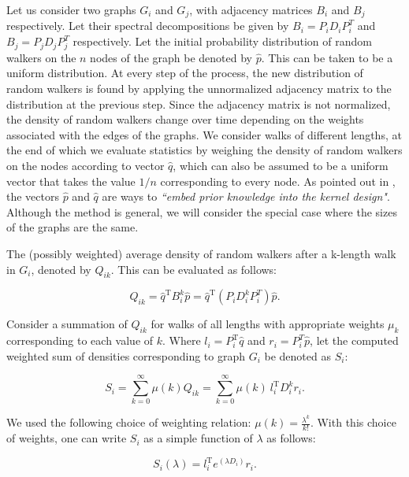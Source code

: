 Let us consider two graphs $G_i$ and $G_j$, with adjacency matrices
$B_i$ and $B_j$ respectively.
% 
Let their spectral decompositions be given by $B_i = P_i D_i P_i^{T}$
and $B_j = P_j D_j P_j^{T}$ respectively.
% 
% 
Let the initial probability distribution of random walkers on the $n$
nodes of the graph be denoted by $\hat{p}$.
% 
This can be taken to be a uniform distribution.
% 
At every step of the process, the new distribution of random walkers
is found by applying the unnormalized adjacency matrix to the
distribution at the previous step.
% 
Since the adjacency matrix is not normalized, the density of random
walkers change over time depending on the weights associated with the
edges of the graphs.
% 
We consider walks of different lengths, at the end of which we
evaluate statistics by weighing the density of random walkers on the
nodes according to vector $\hat{q}$, which can also be assumed to be a
uniform vector that takes the value $1/n$ corresponding to every node.
% 
As pointed out in \cite{Vis10graph}, the vectors $\hat{p}$ and
$\hat{q}$ are ways to \emph{``embed prior knowledge into the kernel
  design"}.
% 
Although the method is general, we will consider the special case
where the sizes of the graphs are the same.


The (possibly weighted) average density of random walkers after a
k-length walk in $G_i$, denoted by $Q_{ik}$.
% 
This can be evaluated as follows:

\begin{equation}
  Q_{ik} = \hat{q}^\mathrm{T}B_i^k \hat{p} = \hat{q}^\mathrm{T} (P_i D_i^k P_i^{T}) \hat{p}.
\end{equation}

Consider a summation of $Q_{ik}$ for walks of all lengths with
appropriate weights $\mu_k$ corresponding to each value of $k$.
% 
Where $l_i=P_i^\mathrm{T}\hat{q}$ and $r_i=P_i^{T} \hat{p}$, let the
computed weighted sum of densities corresponding to graph $G_i$ be
denoted as $S_i$:

\begin{equation}
  S_i = \sum_{k=0}^{\infty} \mu(k) Q_{ik} = \sum_{k=0}^{\infty} \mu(k)~l_i^\mathrm{T} D_i^k r_i.
\end{equation}

We used the following choice of weighting relation:
$\mu(k) = \frac{\lambda^k}{k!}$.
% 
With this choice of weights, one can write $S_i$ as a simple function
of $\lambda$ as follows:

\begin{equation}
  S_i(\lambda) = l_i^\mathrm{T}e^{(\lambda D_i)}r_i.
  \label{eq:S}
\end{equation}


